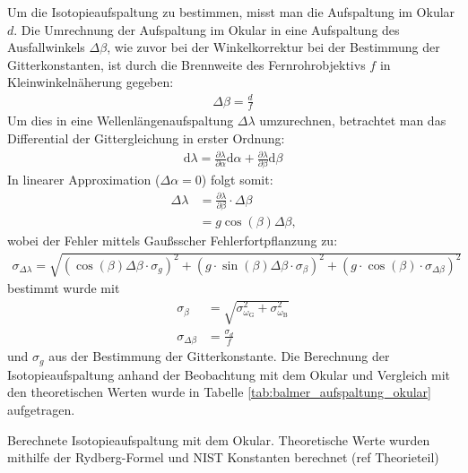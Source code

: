 \documentclass[11pt, a4paper]{article}
\numberwithin{equation}{section}
\begin{document}
Um die Isotopieaufspaltung zu bestimmen, misst man die Aufspaltung im Okular $d$.
Die Umrechnung der Aufspaltung im Okular in eine Aufspaltung des Ausfallwinkels $\Delta \beta$, wie zuvor bei der Winkelkorrektur bei der Bestimmung der Gitterkonstanten, ist durch die Brennweite des Fernrohrobjektivs $f$ in Kleinwinkelnäherung gegeben:
\begin{align*}
  \Delta \beta = \frac{d}{f}
\end{align*}
Um dies in eine Wellenlängenaufspaltung $\Delta \lambda$ umzurechnen, betrachtet man das Differential der Gittergleichung in erster Ordnung:
\begin{align*}
  \mathrm{d}\lambda = \frac{\partial \lambda}{\partial \alpha} \mathrm{d}\alpha + \frac{\partial \lambda}{\partial \beta} \mathrm{d}\beta
\end{align*}
In linearer Approximation ($\Delta \alpha = \num{0}$) folgt somit:
\begin{align}
  \Delta \lambda &= \frac{\partial \lambda}{\partial \beta} \cdot \Delta \beta \\
  &= g \cos(\beta) \Delta \beta \text{,}
  \label{eq:gitter_differenzial}
\end{align}
wobei der Fehler mittels Gaußsscher Fehlerfortpflanzung zu:
\begin{align*}
	\sigma_{\Delta \lambda} = \sqrt{\left( \cos(\beta) \Delta \beta \cdot \sigma_g \right)^2 + \left( g \cdot \sin(\beta) \Delta \beta \cdot \sigma_\beta \right)^2 + \left( g \cdot \cos(\beta) \cdot \sigma_{\Delta \beta}\right)^2}
\end{align*}
bestimmt wurde mit
\begin{align*}
	\sigma_\beta &= \sqrt{\sigma_{\omega_\mathrm{G}}^2 + \sigma_{\omega_\mathrm{B}}^2} \\
	\sigma_{\Delta \beta} &= \frac{\sigma_d}{f}
\end{align*}
und $\sigma_g$ aus der Bestimmung der Gitterkonstante.
Die Berechnung der Isotopieaufspaltung anhand der Beobachtung mit dem Okular und Vergleich mit den theoretischen Werten wurde in Tabelle \ref{tab:balmer_aufspaltung_okular} aufgetragen.
\begin{table}[h]
	\centering
	
	\caption{Berechnete Isotopieaufspaltung mit dem Okular. Theoretische Werte wurden mithilfe der Rydberg-Formel und NIST Konstanten berechnet (ref Theorieteil)}
	\label{tab:balmer_aufspaltung_okular}
\end{table}
\end{document}
